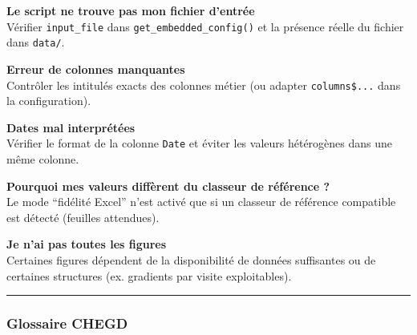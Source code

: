 \textbf{Le script ne trouve pas mon fichier d'entrée}\\
Vérifier \texttt{input\_file} dans \texttt{get\_embedded\_config()} et
la présence réelle du fichier dans \texttt{data/}.

\textbf{Erreur de colonnes manquantes}\\
Contrôler les intitulés exacts des colonnes métier (ou adapter
\texttt{columns\$...} dans la configuration).

\textbf{Dates mal interprétées}\\
Vérifier le format de la colonne \texttt{Date} et éviter les valeurs
hétérogènes dans une même colonne.

\textbf{Pourquoi mes valeurs diffèrent du classeur de référence ?}\\
Le mode ``fidélité Excel'' n'est activé que si un classeur de référence
compatible est détecté (feuilles attendues).

\textbf{Je n'ai pas toutes les figures}\\
Certaines figures dépendent de la disponibilité de données suffisantes
ou de certaines structures (ex. gradients par visite exploitables).

\begin{center}\rule{0.5\linewidth}{0.5pt}\end{center}

\subsubsection{Glossaire CHEGD}\label{glossaire-chegd}

